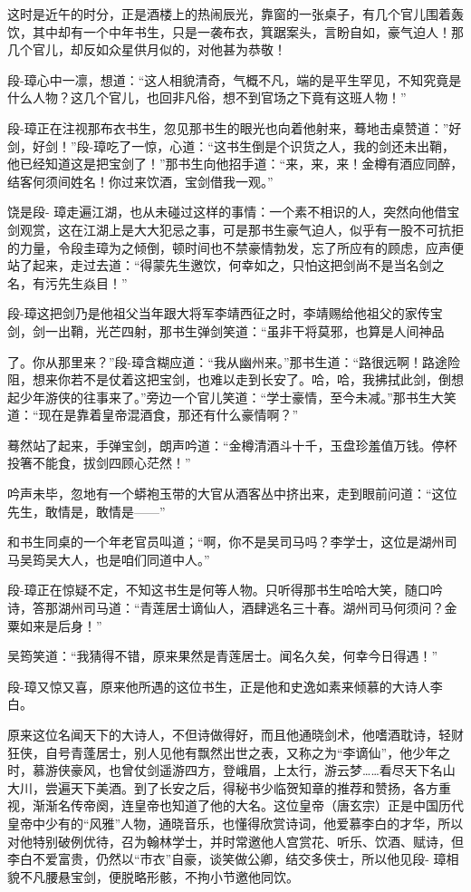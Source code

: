 \documentclass[12pt,oneside]{book}
\begin{document}
这时是近午的时分，正是酒楼上的热闹辰光，靠窗的一张桌子，有几个官儿围着轰饮，其中却有一个中年书生，只是一袭布衣，箕踞案头，言盼自如，豪气迫人！那几个官儿，却反如众星供月似的，对他甚为恭敬！

段-璋心中一凛，想道：``这人相貌清奇，气概不凡，端的是平生罕见，不知究竟是什么人物？这几个官儿，也回非凡俗，想不到官场之下竟有这班人物！''

段-璋正在注视那布衣书生，忽见那书生的眼光也向着他射来，蓦地击桌赞道：''好剑，好剑！''段-璋吃了一惊，心道：``这书生倒是个识货之人，我的剑还未出鞘，他已经知道这是把宝剑了！''那书生向他招手道：``来，来，来！金樽有酒应同醉，结客何须间姓名！你过来饮酒，宝剑借我一观。''

饶是段-
璋走遍江湖，也从未碰过这样的事情：一个素不相识的人，突然向他借宝剑观赏，这在江湖上是大大犯忌之事，可是那书生豪气迫人，似乎有一股不可抗拒的力量，令段圭璋为之倾倒，顿时间也不禁豪情勃发，忘了所应有的顾虑，应声便站了起来，走过去道：``得蒙先生邀饮，何幸如之，只怕这把剑尚不是当名剑之名，有污先生焱目！''

段-璋这把剑乃是他祖父当年跟大将军李靖西征之时，李靖赐给他祖父的家传宝剑，剑一出鞘，光芒四射，那书生弹剑笑道：``虽非干将莫邪，也算是人间神品

了。你从那里来？''段-璋含糊应道：``我从幽州来。''那书生道：``路很远啊！路途险阻，想来你若不是仗着这把宝剑，也难以走到长安了。哈，哈，我拂拭此剑，倒想起少年游侠的往事来了。''旁边一个官儿笑道：``学士豪情，至今未减。''那书生大笑道：``现在是靠着皇帝混酒食，那还有什么豪情啊？''

蓦然站了起来，手弹宝剑，朗声吟道：``金樽清酒斗十千，玉盘珍羞值万钱。停杯投箸不能食，拔剑四顾心茫然！''

吟声未毕，忽地有一个蟒袍玉带的大官从酒客丛中挤出来，走到眼前问道：``这位先生，敢情是，敢情是------''

和书生同桌的一个年老官员叫道；``啊，你不是吴司马吗？李学士，这位是湖州司马吴筠吴大人，也是咱们同道中人。''

段-璋正在惊疑不定，不知这书生是何等人物。只听得那书生哈哈大笑，随口吟诗，答那湖州司马道：``青莲居士谪仙人，酒肆逃名三十春。湖州司马何须问？金粟如来是后身！''

吴筠笑道：``我猜得不错，原来果然是青莲居士。闻名久矣，何幸今日得遇！''

段-璋又惊又喜，原来他所遇的这位书生，正是他和史逸如素来倾慕的大诗人李白。

原来这位名闻天下的大诗人，不但诗做得好，而且他通晓剑术，他嗜酒耽诗，轻财狂侠，自号青蓬居士，别人见他有飘然出世之表，又称之为``李谪仙''，他少年之时，慕游侠豪风，也曾仗剑遥游四方，登峨眉，上太行，游云梦\ldots\ldots 看尽天下名山大川，尝遍天下美酒。到了长安之后，得秘书少临贺知章的推荐和赞扬，各方重视，渐渐名传帝阕，连皇帝也知道了他的大名。这位皇帝（唐玄宗）正是中国历代皇帝中少有的``风雅''人物，通晓音乐，也懂得欣赏诗词，他爱慕李白的才华，所以对他特别破例优待，召为翰林学士，并时常邀他人宫赏花、听乐、饮酒、赋诗，但李白不爱富贵，仍然以``市衣''自豪，谈笑做公卿，结交多侠士，所以他见段-
璋相貌不凡腰悬宝剑，便脱略形骸，不拘小节邀他同饮。
\end{document}
